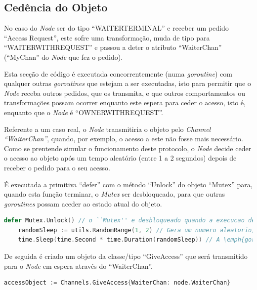 \subsection*{Cedência do Objeto}
No caso do \emph{Node} ser do tipo ``WAITER\textunderscore TERMINAL'' e receber um pedido ``Access Request'', 
este sofre uma transformação, muda de tipo para ``WAITER\textunderscore WITH\textunderscore REQUEST''
e passou a deter o atributo ``WaiterChan'' (``MyChan'' do \emph{Node} que fez o pedido).

Esta secção de código é executada concorrentemente (numa \emph{goroutine}) com qualquer outras \emph{goroutines} 
que estejam a ser executadas,
isto para permitir que o \emph{Node} receba outros pedidos,
que os transmita, e que outros comportamentos ou transformações possam ocorrer 
enquanto este espera para ceder o acesso, isto é, enquanto que o \emph{Node} é ``OWNER\textunderscore WITH\textunderscore REQUEST''.


Referente a um caso real, o \emph{Node} transmitiria o objeto pelo \emph{Channel ``WaiterChan''}, quando, por exemplo, 
o acesso a este não fosse mais necessário.
Como se prentende simular o funcionamento deste protocolo, o \emph{Node} decide ceder o acesso ao objeto após um tempo aleatório (entre 1 a 2 segundos)
depois de receber o pedido para o seu acesso.

É executada a primitiva ``defer'' com o método ``Unlock'' do objeto ``Mutex'' para,
quando esta função terminar, o \emph{Mutex} ser desbloqueado, para que outras \emph{goroutines}
possam aceder ao estado atual do objeto.

\begin{lstlisting}[caption={\emph{Node} espera 1 ou 2 segundos antes de ceder o objeto.},language=Go]
	defer Mutex.Unlock() // o ``Mutex'' e desbloqueado quando a execucao deste metodo terminar
	randomSleep := utils.RandomRange(1, 2) // Gera um numero aleatorio, neste caso, 1 ou 2
	time.Sleep(time.Second * time.Duration(randomSleep)) // A \emph{goroutine} espera durante o tempo aleatorio gerado (em segundos)
\end{lstlisting}

De seguida é criado um objeto da classe/tipo ``GiveAccess'' que será transmitido para o \emph{Node} em espera 
através do ``WaiterChan''.

\begin{lstlisting}[caption={Criação do objeto ``accessObject'', da classe ``GiveAccess''},language=Go]
	accessObject := Channels.GiveAccess{WaiterChan: node.WaiterChan}
\end{lstlisting}


